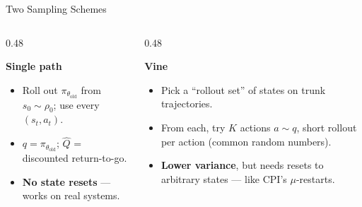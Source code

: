 \documentclass[aspectratio=169]{beamer}
\newcommand{\told}{\theta_{\mathrm{old}}}
\begin{document}
\begin{frame}{Two Sampling Schemes}
  \begin{columns}[t]
    \begin{column}{0.48\textwidth}
      \begin{warmbox}
        \small\textbf{\color{AtlasWarm}Single path}
        \begin{itemize}
          \item Roll out $\pi_{\told}$ from $s_0\sim\rho_0$; use every $(s_t,a_t)$.
          \item $q = \pi_{\told}$; $\hat Q$ = discounted return-to-go.
          \item \textbf{No state resets} --- works on real systems.
        \end{itemize}
      \end{warmbox}
    \end{column}
    \begin{column}{0.48\textwidth}
      \begin{coolbox}
        \small\textbf{\color{AtlasCool}Vine}
        \begin{itemize}
          \item Pick a ``rollout set'' of states on trunk trajectories.
          \item From each, try $K$ actions $a\sim q$, short rollout per action (common random numbers).
          \item \textbf{Lower variance}, but needs resets to arbitrary states --- like CPI's $\mu$-restarts.
        \end{itemize}
      \end{coolbox}
    \end{column}
  \end{columns}
\end{frame}
\end{document}
